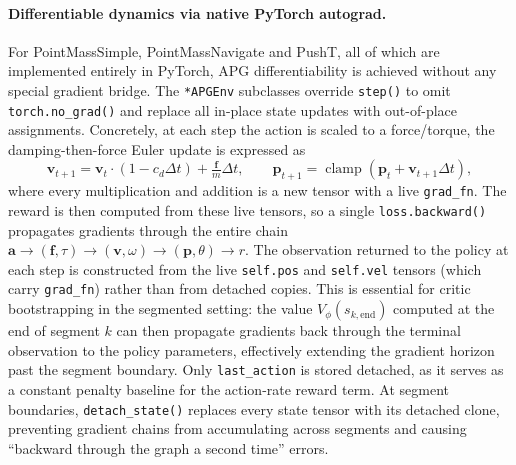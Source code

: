 \documentclass[11pt,a4paper]{article}
\newcommand{\ba}{\mathbf{a}}
\begin{document}
\paragraph{Differentiable dynamics via native PyTorch autograd.}
For PointMassSimple, PointMassNavigate and PushT, all of which are implemented entirely in PyTorch, APG differentiability is achieved without any special gradient bridge.
The \texttt{*APGEnv} subclasses override \texttt{step()} to omit \texttt{torch.no\_grad()} and replace all in-place state updates with out-of-place assignments.
Concretely, at each step the action is scaled to a force/torque, the damping-then-force Euler update is expressed as
\[
  \mathbf{v}_{t+1} = \mathbf{v}_t \cdot (1 - c_d \Delta t) + \tfrac{\mathbf{f}}{m} \Delta t, \qquad
  \mathbf{p}_{t+1} = \operatorname{clamp}(\mathbf{p}_t + \mathbf{v}_{t+1} \Delta t),
\]
where every multiplication and addition is a new tensor with a live \texttt{grad\_fn}.
The reward is then computed from these live tensors, so a single \texttt{loss.backward()} propagates gradients through the entire chain $\ba \to (\mathbf{f}, \tau) \to (\mathbf{v}, \omega) \to (\mathbf{p}, \theta) \to r$.
The observation returned to the policy at each step is constructed from the live \texttt{self.pos} and \texttt{self.vel} tensors (which carry \texttt{grad\_fn}) rather than from detached copies. This is essential for critic bootstrapping in the segmented setting: the value $V_\phi(s_{k,\text{end}})$ computed at the end of segment $k$ can then propagate gradients back through the terminal observation to the policy parameters, effectively extending the gradient horizon past the segment boundary. Only \texttt{last\_action} is stored detached, as it serves as a constant penalty baseline for the action-rate reward term.
At segment boundaries, \texttt{detach\_state()} replaces every state tensor with its detached clone, preventing gradient chains from accumulating across segments and causing ``backward through the graph a second time'' errors.
\end{document}
